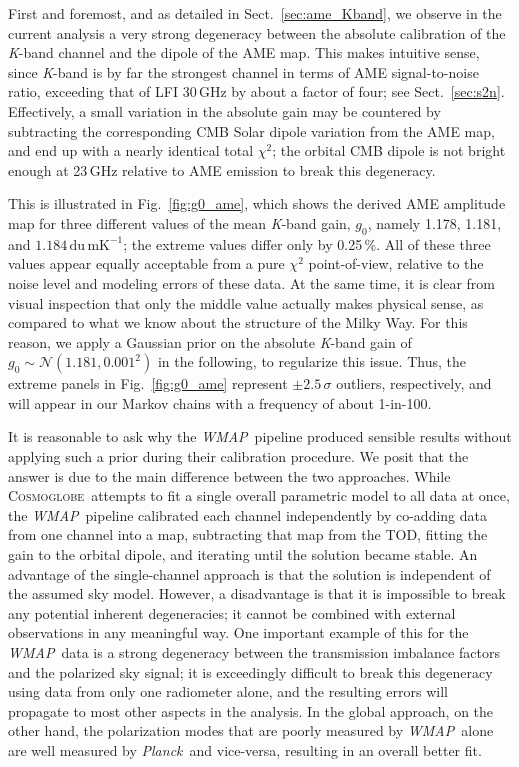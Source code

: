 \documentclass[twocolumn]{../../common/aa}
\def\WMAP{\emph{WMAP}}
\def\Planck{\emph{Planck}}
\newcommand{\cosmoglobe}{\textsc{Cosmoglobe}}
\newcommand{\K}[0]{\textit K}
\begin{document}
First and foremost, and as detailed in Sect.~\ref{sec:ame_Kband}, we observe in the current analysis a very strong degeneracy between the absolute calibration of the \K-band channel and the dipole of the AME map. This makes intuitive sense, since \K-band is by far the strongest channel in terms of AME signal-to-noise ratio, exceeding that of LFI 30\,GHz by about a factor of four; see Sect.~\ref{sec:s2n}. Effectively, a small variation in the absolute gain may be countered by subtracting the corresponding CMB Solar dipole variation from the AME map, and end up with a nearly identical total $\chi^2$; the orbital CMB dipole is not bright enough at 23\,GHz relative to AME emission to break this degeneracy.

This is illustrated in Fig.~\ref{fig:g0_ame}, which shows the derived AME amplitude map for three different values of the mean \K-band gain, $g_0$, namely 1.178, 1.181, and $1.184\,\mathrm{du\,mK^{-1}}$; the extreme values differ only by 0.25\,\%. All of these three values appear equally acceptable from a pure $\chi^2$ point-of-view, relative to the noise level and modeling errors of these data. At the same time, it is clear from visual inspection that only the middle value actually makes physical sense, as compared to what we know about the structure of the Milky Way. For this reason, we apply a Gaussian prior on the absolute \K-band gain of $g_0 \sim \mathcal N(1.181, 0.001^2)$ in the following, to regularize this issue. Thus, the extreme panels in Fig.~\ref{fig:g0_ame} represent $\pm2.5\,\sigma$ outliers, respectively, and will appear in our Markov chains with a frequency of about 1-in-100.

It is reasonable to ask why the \WMAP\ pipeline produced sensible results without applying such a prior during their calibration procedure. We posit that the answer is due to the main difference between the two approaches. While \cosmoglobe\ attempts to fit a single overall parametric model to all data at once, the \WMAP\ pipeline calibrated each channel independently by co-adding data from one channel into a map, subtracting that map from the TOD, fitting the gain to the orbital dipole, and iterating until the solution became stable. An advantage of the single-channel approach is that the solution is independent of the assumed sky model. However, a disadvantage is that it is impossible to break any potential inherent degeneracies; it cannot be combined with external observations in any meaningful way. One important example of this for the \WMAP\ data is a strong degeneracy between the transmission imbalance factors and the polarized sky signal; it is exceedingly difficult to break this degeneracy using data from only one radiometer alone, and the resulting errors will propagate to most other aspects in the analysis. In the global approach, on the other hand, the polarization modes that are poorly measured by \WMAP\ alone are well measured by \Planck\ and vice-versa, resulting in an overall better fit. 
\end{document}
